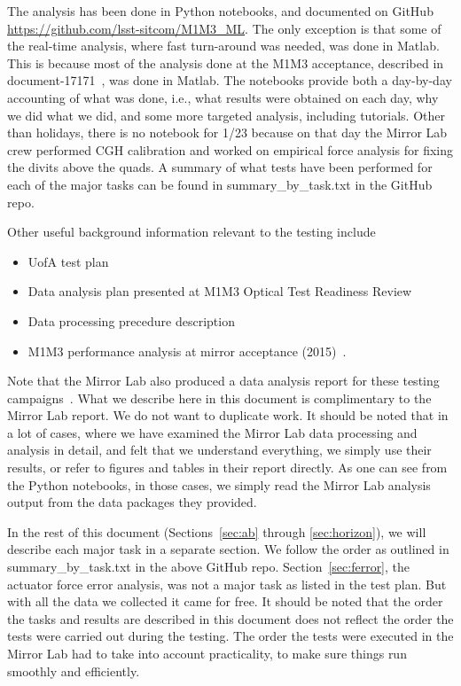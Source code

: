 \documentclass [twoside,openbib,12pt]{article}
\newcommand{\bitm}{\begin{itemize}}
\newcommand{\eitm}{\end{itemize}}
\begin{document}
The analysis has been done in Python notebooks, and documented on
GitHub \url{https://github.com/lsst-sitcom/M1M3_ML}.
The only exception is that some of the real-time analysis, where fast
turn-around was needed, was done in Matlab. This is because most of
the analysis done at the M1M3 acceptance, described in document-17171~\cite{m1m3perf},
was done in Matlab.
The notebooks provide both a day-by-day accounting of what was done, i.e.,
what results were obtained on each day, why we did what we did, and some more targeted
analysis, including tutorials.
Other than holidays, there is no notebook for 1/23 because on that day
the Mirror Lab crew performed CGH calibration and worked on
empirical force analysis for fixing the divits above the quads.
A summary of what tests have been performed for each of the major
tasks can be found in summary\_by\_task.txt in the GitHub repo.

Other useful background information relevant to the testing include
\bitm
\item UofA test plan~\cite{m1m3UAtestplan}
\item  Data analysis plan presented at M1M3 Optical Test Readiness
  Review~\cite{m1m3anaplan}
\item Data processing precedure description~\cite{m1m3processing}
\item M1M3 performance analysis at mirror acceptance (2015)~\cite{m1m3perf}.
\eitm
Note that the Mirror Lab also produced a data analysis report for
these testing campaigns~\cite{m1m3UAreport}. What we describe here in this document is
complimentary to the Mirror Lab report.
We do not want to duplicate work.
It should be noted that in a lot of cases, where we have examined the
Mirror Lab data processing and analysis in detail, and felt that we
understand everything, we simply use their results, or refer to
figures and tables in their report directly.
As one can see from the Python notebooks, in those cases, we simply
read the Mirror Lab analysis output from the data packages they provided.

In the rest of this document (Sections~\ref{sec:ab} through \ref{sec:horizon}), we will describe each major task in a
separate section. We follow the order as outlined in
summary\_by\_task.txt in the above GitHub repo.
Section~\ref{sec:ferror}, the actuator force error analysis, was not a
major task as listed in the test plan.
But with all the data we collected it came for free.
It should be noted that the order the tasks and results are described
in this document does not reflect the order the tests were carried out
during the testing.
The order the tests were executed in the Mirror Lab had to take into
account practicality, to make sure things run smoothly and efficiently.
\end{document}
